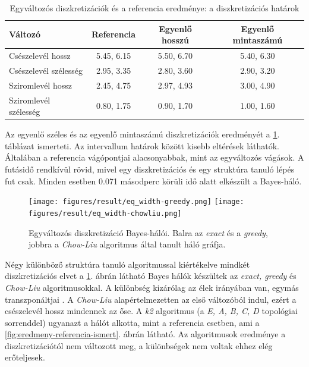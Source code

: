\begin{table}[htp]\centering
    \begin{tabular}{lccc}
        Változó               & Referencia & Egyenlő hosszú & Egyenlő mintaszámú \\ \hline
        Csészelevél hossz     & 5.45, 6.15 & 5.50, 6.70     & 5.40, 6.30                              \\
        Csészelevél szélesség & 2.95, 3.35 & 2.80, 3.60     & 2.90, 3.20                              \\
        Sziromlevél hossz     & 2.45, 4.75 & 2.97, 4.93     & 3.00, 4.90                              \\
        Sziromlevél szélesség & 0.80, 1.75 & 0.90, 1.70     & 1.00, 1.60                              \\
    \end{tabular}
\caption{Egyváltozós diszkretizációk és a referencia eredménye: a diszkretizációs határok}
\label{tab:eredmeny-egyvaltozos}
\end{table}


Az egyenlő széles és az egyenlő mintaszámú diszkretizációk eredményét a \ref{tab:eredmeny-egyvaltozos}. táblázat ismerteti. Az intervallum határok között kisebb eltérések láthatók. Általában a referencia vágópontjai alacsonyabbak, mint az egyváltozós vágások. A futásidő rendkívül rövid, mivel egy diszkretizációs és egy struktúra tanuló lépés fut csak. Minden esetben 0.071 másodperc körüli idő alatt elkészült a Bayes-háló.

\begin{figure}[htp]
    \centering
    \texttt{[image: figures/result/eq\_width-greedy.png]} \hfill
    \texttt{[image: figures/result/eq\_width-chowliu.png]}
    \caption{Egyváltozós diszkretizáció Bayes-hálói. Balra az \emph{exact} és a \emph{greedy}, jobbra a \emph{Chow-Liu} algoritmus által tanult háló gráfja.}
    \label{fig:eredmeny-egyvaltozos}
\end{figure}

Négy különböző struktúra tanuló algoritmussal kiértékelve mindkét diszkretizációs elvet a \ref{fig:eredmeny-egyvaltozos}. ábrán látható Bayes hálók készültek az \emph{exact, greedy} és \emph{Chow-Liu} algoritmusokkal. A különbség kizárólag az élek irányában van, egymás transzponáltjai \cite{essam1970some}. A \emph{Chow-Liu} alapértelmezetten az első változóból indul, ezért a csészelevél hossz mindennek az őse. A \emph{k2} algoritmus (a \emph{E, A, B, C, D} topológiai sorrenddel) ugyanazt a hálót alkotta, mint a referencia esetben, ami a \ref{fig:eredmeny-referencia-ismert}. ábrán látható. Az algoritmusok eredménye a diszkretizációtól nem változott meg, a különbségek nem voltak ehhez elég erőteljesek.

